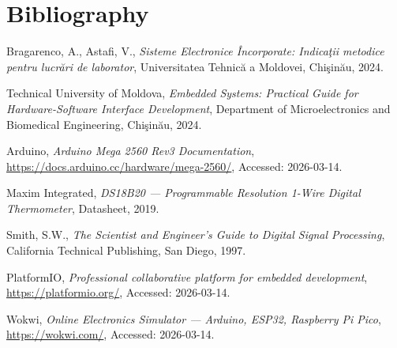 \section{Bibliography}

\begin{enumerate}[label={[\arabic*]}]
    \item Bragarenco, A., Astafi, V., \textit{Sisteme Electronice \^{I}ncorporate: Indica\c{t}ii metodice pentru lucr\u{a}ri de laborator}, Universitatea Tehnic\u{a} a Moldovei, Chi\c{s}in\u{a}u, 2024.

    \item Technical University of Moldova, \textit{Embedded Systems: Practical Guide for Hardware-Software Interface Development}, Department of Microelectronics and Biomedical Engineering, Chi\c{s}in\u{a}u, 2024.

    \item Arduino, \textit{Arduino Mega 2560 Rev3 Documentation}, \url{https://docs.arduino.cc/hardware/mega-2560/}, Accessed: 2026-03-14.

    \item Maxim Integrated, \textit{DS18B20 --- Programmable Resolution 1-Wire Digital Thermometer}, Datasheet, 2019.

    \item Smith, S.W., \textit{The Scientist and Engineer's Guide to Digital Signal Processing}, California Technical Publishing, San Diego, 1997.

    \item PlatformIO, \textit{Professional collaborative platform for embedded development}, \url{https://platformio.org/}, Accessed: 2026-03-14.

    \item Wokwi, \textit{Online Electronics Simulator --- Arduino, ESP32, Raspberry Pi Pico}, \url{https://wokwi.com/}, Accessed: 2026-03-14.
\end{enumerate}

